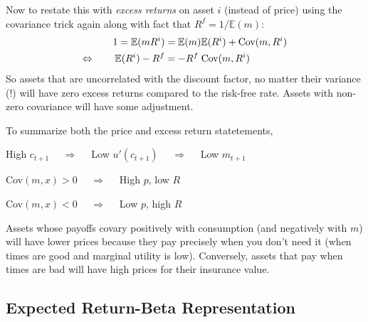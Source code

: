 \documentclass[12pt]{article}
\theoremstyle{plain}
\theoremstyle{definition}
\theoremstyle{remark}
\begin{document}
Now to restate this with \emph{excess returns} on asset $i$ (instead of
price) using the covariance trick again along with fact that
$R^f=1/\mathbb{E}(m)$:
\begin{align}
  1 = \mathbb{E}(mR^i)
  &= \mathbb{E}(m) \mathbb{E}(R^i) + \text{Cov}(m,R^i)\notag\\
  \Leftrightarrow \qquad
  \mathbb{E}(R^i) - R^f
  &= - R^f \; \text{Cov}(m,R^i)\label{eq:riskcorrect}
\end{align}
So assets that are uncorrelated with the discount factor, no matter
their variance (!) will have zero excess returns compared to the
risk-free rate. Assets with non-zero covariance will have some
adjustment.

To summarize both the price and excess return statetements,
\begin{center}
\begin{centering}
  High $c_{t+1}$ $\quad\Rightarrow\quad$
  Low $u'(c_{t+1})$ $\quad\Rightarrow\quad$
  Low $m_{t+1}$
\end{centering}
\end{center}
\begin{center}
\begin{centering}
  Cov$(m,x)>0$  $\quad\Rightarrow\quad$
  High $p$, low $R$
\end{centering}
\end{center}
\begin{center}
\begin{centering}
  Cov$(m,x)<0$  $\quad\Rightarrow\quad$
  Low $p$, high $R$
\end{centering}
\end{center}
Assets whose payoffs covary positively with consumption (and negatively
with $m$) will have lower prices because they pay precisely when you
don't need it (when times are good and marginal utility is low).
Conversely, assets that pay when times are bad will have high prices for
their insurance value.

\subsection{Expected Return-Beta Representation}
\end{document}
